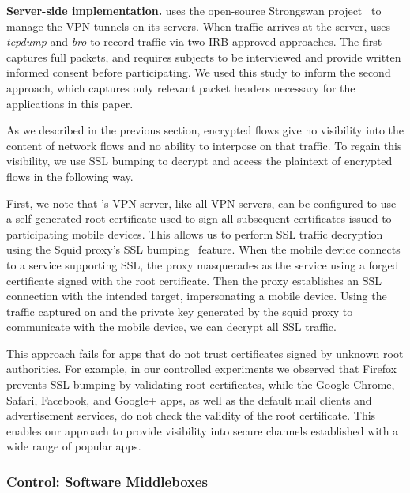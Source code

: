 \noindent\textbf{Server-side implementation.} 
\meddle uses the open-source Strongswan project~\cite{strongswan} to manage the VPN tunnels 
on its servers. When traffic arrives at the server, \meddle uses \emph{tcpdump} and \emph{bro} to record 
traffic via two IRB-approved approaches. The first captures full packets, 
and requires subjects to be interviewed and provide written informed consent before participating. 
We used this study to inform the second approach, which captures only relevant packet headers 
necessary for the \meddle applications in this paper. 

As we described in the previous section, encrypted flows give \meddle no visibility into the 
content of network flows and no ability to interpose on that traffic. To regain this visibility, we use SSL 
bumping to decrypt and access the plaintext of encrypted flows in the following way. 
 
First, we note that \meddle's VPN server, like all VPN servers, can be configured to use a self-generated root certificate used to sign all subsequent certificates issued to participating mobile devices. 
This allows us to perform SSL traffic decryption using the Squid proxy's SSL bumping~\cite{sslbump} feature.
When the mobile device connects to a service supporting SSL, the proxy masquerades as the service using a forged certificate signed with the \meddle root certificate. 
Then the proxy establishes an SSL connection with the intended target, impersonating a mobile device. 
Using the traffic captured on \meddle and the private key generated by the squid proxy to communicate with the mobile device, we can decrypt all SSL traffic. 

This approach fails for apps that do not trust certificates signed by unknown root authorities. 
For example, in our controlled experiments we observed that Firefox prevents SSL bumping by validating root certificates, while the Google Chrome, Safari, Facebook, and Google+ apps, as well as the default mail clients and advertisement services, do not check the validity of the root certificate. 
This enables our approach to provide visibility into secure channels established with a wide range of popular apps. 


\subsubsection{Control: Software Middleboxes}
\label{subsec:design_control}

